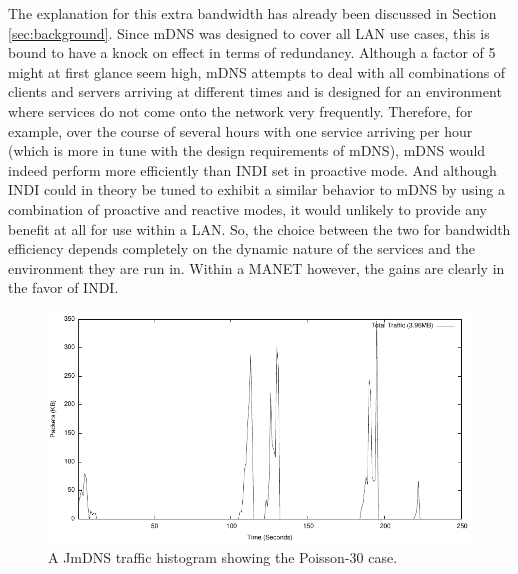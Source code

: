 The explanation for this extra bandwidth has already been discussed in Section \ref{sec:background}.  Since mDNS was designed to cover all LAN use cases, this is bound to have a knock on effect in terms of redundancy. Although a factor of 5 might at first glance seem high, mDNS attempts to deal with all combinations of clients and servers arriving at different times and is designed for an environment where services do not come onto the network very frequently.  Therefore, for example, over the course of several hours with one service arriving per hour (which is more in tune with the design requirements of mDNS), mDNS would indeed perform more efficiently than INDI set in proactive mode.  And although INDI could in theory be tuned to exhibit a similar behavior to mDNS by using a combination of proactive and reactive modes, it would unlikely to provide any benefit at all for use within a LAN.    So, the choice between the two for bandwidth efficiency depends completely on the dynamic nature of the services and the environment they are run in. Within a MANET however, the gains are clearly in the favor of INDI.   

\begin{figure}[htb]
\centering
\includegraphics[scale=1.0]{jmdns30packet-distribution.pdf}
\caption{A JmDNS traffic histogram showing the Poisson-30 case.   } 
\label{indi:fig:jmdns-30-traffic}
\end{figure}

